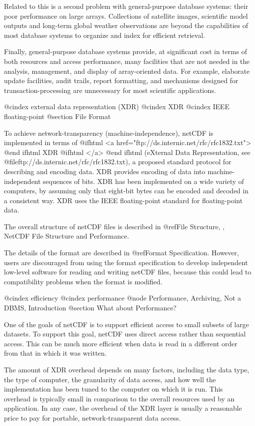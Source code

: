 Related to this is a second problem with general-purpose database
systems: their poor performance on large arrays.
Collections of satellite images, scientific model outputs
and long-term global weather observations
are beyond the capabilities of most database systems to
organize and index for efficient retrieval.

Finally, general-purpose database systems provide, at significant cost
in terms of both resources and access performance, many facilities that
are not needed in the analysis, management, and display of array-oriented
data.  For example, elaborate update facilities,
audit trails, report formatting, and mechanisms designed for
transaction-processing are unnecessary for most scientific applications.

@cindex external data representation (XDR)
@cindex XDR
@cindex IEEE floating-point
@section File Format

To achieve network-transparency (machine-independence),
netCDF is implemented in terms of
@ifhtml
<a href="ftp://ds.internic.net/rfc/rfc1832.txt">
@end ifhtml
XDR
@ifhtml
</a>
@end ifhtml
(eXternal Data Representation, see @file{ftp://ds.internic.net/rfc/rfc1832.txt}),
a proposed standard protocol for
describing and encoding data.  XDR provides encoding of
data into machine-independent sequences of bits.
XDR has been implemented on a wide variety of computers, by assuming
only that eight-bit bytes can be encoded and decoded in a consistent
way.
XDR uses the IEEE floating-point standard for floating-point data.

The overall structure of netCDF files is described in
@ref{File Structure, , NetCDF File Structure and Performance}.

The details of the format are described in @ref{Format Specification}.
However, users are discouraged from using the format specification to
develop independent low-level software for reading and writing netCDF
files, because this could lead to compatibility problems when the format
is modified.

@cindex efficiency
@cindex performance
@node Performance, Archiving, Not a DBMS, Introduction
@section What about Performance?

One of the goals of netCDF is to support efficient access to small
subsets of large datasets.  To support this goal, netCDF uses direct
access rather than sequential access.
This can be much more efficient when
data is read in a different order from that in which it was written.

The amount of XDR overhead depends on many factors,
including the data type, the type of computer, the granularity of data
access, and how well the implementation has been tuned to the computer
on which it is run.
This overhead is typically small in comparison to the overall resources
used by an application.
In any case, the overhead of
the XDR layer is usually a reasonable price to pay for portable,
network-transparent data access.

